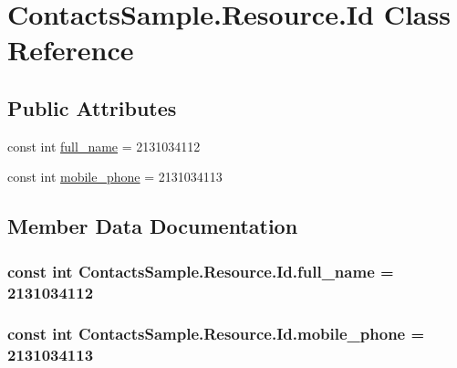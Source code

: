 \hypertarget{class_contacts_sample_1_1_resource_1_1_id}{\section{Contacts\+Sample.\+Resource.\+Id Class Reference}
\label{class_contacts_sample_1_1_resource_1_1_id}
}
\subsection*{Public Attributes}
\begin{DoxyCompactItemize}
\item 
const int \hyperlink{class_contacts_sample_1_1_resource_1_1_id_a23d680cedc818e7e9f0e02b3634ace88}{full\+\_\+name} = 2131034112
\item 
const int \hyperlink{class_contacts_sample_1_1_resource_1_1_id_a0a33d309f304cd3d92210b7f036a15b1}{mobile\+\_\+phone} = 2131034113
\end{DoxyCompactItemize}


\subsection{Member Data Documentation}
\hypertarget{class_contacts_sample_1_1_resource_1_1_id_a23d680cedc818e7e9f0e02b3634ace88}{
\subsubsection[{full\+\_\+name}]{\setlength{\rightskip}{0pt plus 5cm}const int Contacts\+Sample.\+Resource.\+Id.\+full\+\_\+name = 2131034112}}\label{class_contacts_sample_1_1_resource_1_1_id_a23d680cedc818e7e9f0e02b3634ace88}
\hypertarget{class_contacts_sample_1_1_resource_1_1_id_a0a33d309f304cd3d92210b7f036a15b1}{
\subsubsection[{mobile\+\_\+phone}]{\setlength{\rightskip}{0pt plus 5cm}const int Contacts\+Sample.\+Resource.\+Id.\+mobile\+\_\+phone = 2131034113}}\label{class_contacts_sample_1_1_resource_1_1_id_a0a33d309f304cd3d92210b7f036a15b1}


